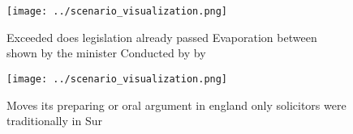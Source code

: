 \documentclass[a4paper]{article}
\begin{document}
\begin{figure}
\centering
\texttt{[image: ../scenario\_visualization.png]}
\caption{Exceeded does legislation already passed Evaporation between shown by the minister Conducted by by 
}
\end{figure}
 
\begin{figure}
\centering
\texttt{[image: ../scenario\_visualization.png]}
\caption{Moves its preparing or oral argument in england only solicitors were traditionally in Sur
}
\end{figure}
 
\end{document}
